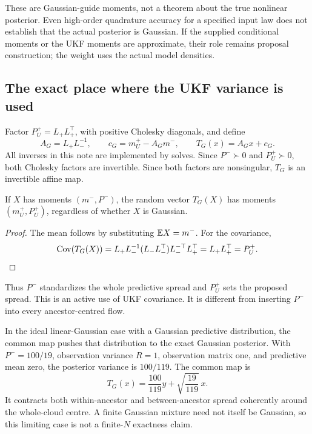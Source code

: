 These are Gaussian-guide moments, not a theorem about the true nonlinear
posterior. Even high-order quadrature accuracy for a specified input law
does not establish that the actual posterior is Gaussian. If the supplied
conditional moments or the UKF moments are approximate, their role remains
proposal construction; the weight uses the actual model densities.

\subsection{The exact place where the UKF variance is used}

Factor \(P_U^+=L_+L_+^\top\), with positive Cholesky diagonals, and define
\begin{equation}
\label{eq:bf-covariance-proposal-global-map}
 A_G=L_+L_-^{-1},\qquad c_G=m_U^+-A_Gm^-,
 \qquad T_G(x)=A_Gx+c_G .
\end{equation}
All inverses in this note are implemented by solves. Since \(P^-\succ0\)
and \(P_U^+\succ0\), both Cholesky factors are invertible. Since both factors
are nonsingular, \(T_G\) is an invertible affine map.

\begin{proposition}
If \(X\) has moments \((m^-,P^-)\), the random vector \(T_G(X)\) has
moments \((m_U^+,P_U^+)\), regardless of whether \(X\) is Gaussian.
\end{proposition}
\begin{proof}
The mean follows by substituting \(\mathbb E X=m^-\). For the covariance,
\begin{equation}
\label{eq:bf-covariance-proposal-global-covariance}
 \operatorname{Cov}(T_G(X))
 =L_+L_-^{-1}(L_-L_-^\top)L_-^{-\top}L_+^\top
 =L_+L_+^\top=P_U^+ .
\end{equation}
\end{proof}

Thus \(P^-\) standardizes the whole predictive spread and \(P_U^+\)
sets the proposed spread. This is an active use of UKF covariance.
It is different from inserting \(P^-\) into every ancestor-centred flow.

In the ideal linear-Gaussian case with a Gaussian predictive distribution,
the common map pushes that distribution to the exact Gaussian posterior.
With \(P^-=100/19\), observation variance \(R=1\), observation matrix one,
and predictive mean zero, the posterior variance is \(100/119\).
The common map is
\[
 T_G(x)=\frac{100}{119}y+\sqrt{\frac{19}{119}}\,x.
\]
It contracts both within-ancestor and between-ancestor spread coherently
around the whole-cloud centre. A finite Gaussian mixture need not itself
be Gaussian, so this limiting case is not a finite-\(N\) exactness claim.

